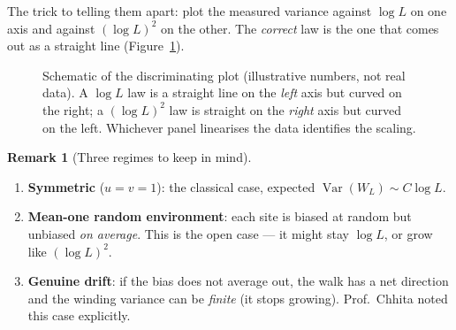\documentclass[11pt]{article}
\theoremstyle{definition}
\newtheorem{remark}{Remark}[section]
\theoremstyle{plain}
\newcommand{\Var}{\operatorname{Var}}
\newcommand{\Wind}{W_{L}}
\begin{document}
The trick to telling them apart: plot the measured variance against $\log L$ on
one axis and against $(\log L)^2$ on the other. The \emph{correct} law is the
one that comes out as a straight line (Figure~\ref{fig:scaling}).

\begin{figure}[h]
\centering
{}
\caption{Schematic of the discriminating plot (illustrative numbers, not real
data). A $\log L$ law is a straight line on the \emph{left} axis but curved on
the right; a $(\log L)^2$ law is straight on the \emph{right} axis but curved on
the left. Whichever panel linearises the data identifies the scaling.}
\label{fig:scaling}
\end{figure}

\begin{remark}[Three regimes to keep in mind]
\begin{enumerate}[leftmargin=1.6em,itemsep=2pt]
  \item \textbf{Symmetric} ($u=v=1$): the classical case, expected
        $\Var(\Wind)\sim C\log L$.
  \item \textbf{Mean-one random environment}: each site is biased at random but
        unbiased \emph{on average}. This is the open case --- it might stay
        $\log L$, or grow like $(\log L)^2$.
  \item \textbf{Genuine drift}: if the bias does not average out, the walk has a
        net direction and the winding variance can be \emph{finite} (it stops
        growing). Prof.\ Chhita noted this case explicitly.
\end{enumerate}
\end{remark}
\end{document}
